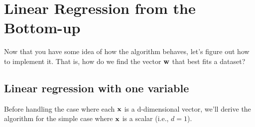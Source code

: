 \documentclass[assignment02_Solutions]{subfiles}
\begin{document}
\section{Linear Regression from the Bottom-up}

Now that you have some idea of how the algorithm behaves, let's figure out how to implement it.  That is, how do we find the vector $\mathbf{w}$ that best fits a dataset?

\subsection{Linear regression with one variable}

Before handling the case where each $\mathbf{x}$ is a d-dimensional vector, we'll derive the algorithm for the simple case where $\mathbf{x}$ is a scalar (i.e., $d=1$).
\end{document}
